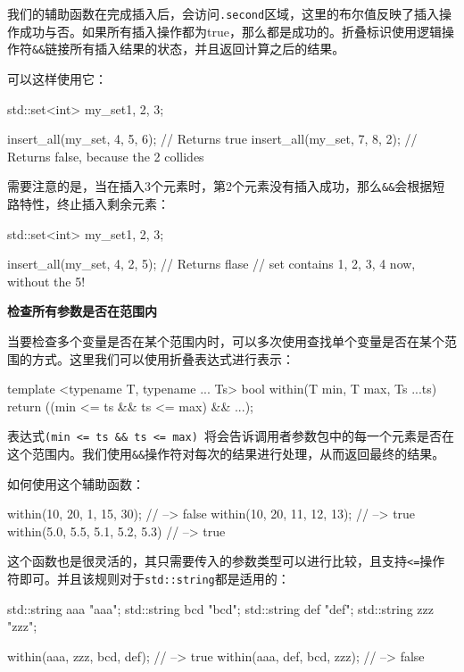 我们的辅助函数在完成插入后，会访问\texttt{.second}区域，这里的布尔值反映了插入操作成功与否。如果所有插入操作都为true，那么都是成功的。折叠标识使用逻辑操作符\texttt{\&\&}链接所有插入结果的状态，并且返回计算之后的结果。

可以这样使用它：

\begin{codebox}[cpp]
std::set<int> my_set{1, 2, 3};

insert_all(my_set, 4, 5, 6); // Returns true
insert_all(my_set, 7, 8, 2); // Returns false, because the 2 collides
\end{codebox}

需要注意的是，当在插入3个元素时，第2个元素没有插入成功，那么\texttt{\&\&}会根据短路特性，终止插入剩余元素：

\begin{codebox}[cpp]
std::set<int> my_set{1, 2, 3};

insert_all(my_set, 4, 2, 5); // Returns flase
// set contains {1, 2, 3, 4} now, without the 5!
\end{codebox}

\textbf{检查所有参数是否在范围内}

当要检查多个变量是否在某个范围内时，可以多次使用查找单个变量是否在某个范围的方式。这里我们可以使用折叠表达式进行表示：

\begin{codebox}[cpp]
template <typename T, typename ... Ts>
bool within(T min, T max, Ts ...ts)
{
    return ((min <= ts && ts <= max) && ...);
}
\end{codebox}

表达式\texttt{(min <= ts \&\& ts <= max) }将会告诉调用者参数包中的每一个元素是否在这个范围内。我们使用\texttt{\&\&}操作符对每次的结果进行处理，从而返回最终的结果。

如何使用这个辅助函数：

\begin{codebox}[cpp]
within(10, 20, 1, 15, 30); // --> false
within(10, 20, 11, 12, 13); // --> true
within(5.0, 5.5, 5.1, 5.2, 5.3) // --> true
\end{codebox}

这个函数也是很灵活的，其只需要传入的参数类型可以进行比较，且支持\texttt{<=}操作符即可。并且该规则对于\texttt{std::string}都是适用的：

\begin{codebox}[cpp]
std::string aaa {"aaa"};
std::string bcd {"bcd"};
std::string def {"def"};
std::string zzz {"zzz"};

within(aaa, zzz, bcd, def); // --> true
within(aaa, def, bcd, zzz); // --> false
\end{codebox}

